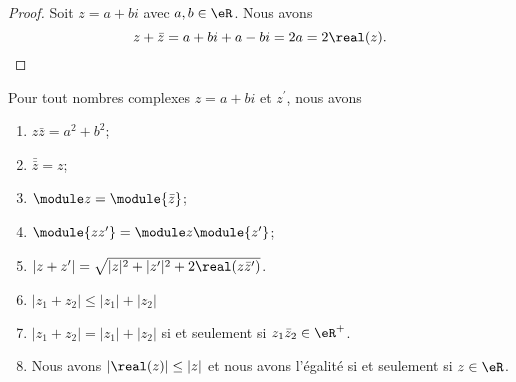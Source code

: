 \begin{proof}
	Soit \( z=a+bi\) avec \( a,b\in \eR\). Nous avons
	\begin{equation}
		z+\bar z=a+bi+a-bi=2a=2\real(z).
	\end{equation}
\end{proof}

\begin{proposition}     \label{PROPooUMVGooIrhZZg}
	Pour tout nombres complexes \( z = a+bi\) et \( z^\prime\), nous avons
	\begin{enumerate}
		\item       \label{ITEMooYBJVooGXiDSd}
		      \( z \bar z = a^2 + b^2\);
		\item       \label{ITEMooCGLSooKHbzkn}
		      \( \bar{\bar{z}} = z\);
		\item       \label{ITEMooDKWDooUjEuZA}
		      \( \module z = \module {\bar z}\);
		\item       \label{ITEMooFXKYooUOXbwH}
		      \( \module{zz^\prime} = \module z \module{z^\prime}\);
		\item     \label{ITEMooUJHPooUFdvqB}
		      \( | z+z' |=\sqrt{ | z |^2+| z' |^2+2\real(z\bar z') }\).
		\item       \label{ITEMooDVMDooFDmOur}
		      \( | z_1+z_2 |\leq | z_1 |+| z_2 |\)
		\item     \label{ITEMooHBIEooEhzlwI}
		      \( | z_1+z_2 |=| z_1 |+| z_2 |\) si et seulement si \( z_1\bar z_2\in \eR^+\).
		\item             \label{ITEMooMCAAooTuUxLV}
		      Nous avons \( | \real(z) |\leq | z |\) et nous avons l'égalité si et seulement si \( z\in \eR\).
	\end{enumerate}
\end{proposition}

